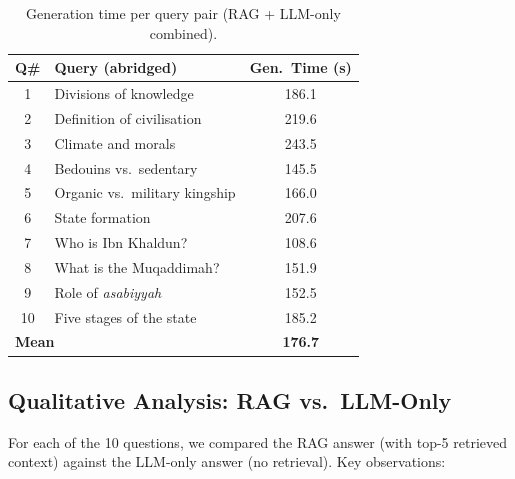 \documentclass[12pt, a4paper]{article}
\renewcommand{\arraystretch}{1.12}
\begin{document}
\begin{table}[H]
\centering
\renewcommand{\arraystretch}{1.3}
\begin{tabular}{c l c}
\toprule
\textbf{Q\#} & \textbf{Query (abridged)} & \textbf{Gen.\ Time (s)} \\
\midrule
1  & Divisions of knowledge         & 186.1 \\
2  & Definition of civilisation     & 219.6 \\
3  & Climate and morals             & 243.5 \\
4  & Bedouins vs.\ sedentary        & 145.5 \\
5  & Organic vs.\ military kingship & 166.0 \\
6  & State formation                & 207.6 \\
7  & Who is Ibn Khaldun?            & 108.6 \\
8  & What is the Muqaddimah?        & 151.9 \\
9  & Role of \emph{asabiyyah}       & 152.5 \\
10 & Five stages of the state       & 185.2 \\
\midrule
\multicolumn{2}{l}{\textbf{Mean}} & \textbf{176.7} \\
\bottomrule
\end{tabular}
\caption{Generation time per query pair (RAG + LLM-only combined).}
\label{tab:p4_times}
\end{table}

\subsection{Qualitative Analysis: RAG vs.\ LLM-Only}

For each of the 10 questions, we compared the RAG answer (with top-5 retrieved
context) against the LLM-only answer (no retrieval).  Key observations:
\end{document}
